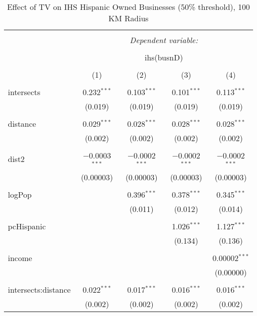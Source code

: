 
\begin{table}[!htbp] \centering 
  \caption{Effect of TV on IHS Hispanic Owned Businesses (50\% threshold), 100 KM Radius} 
  \label{} 
\begin{tabular}{@{\extracolsep{-5pt}}lcccc} 
\\[-1.8ex]\hline 
\hline \\[-1.8ex] 
 & \multicolumn{4}{c}{\textit{Dependent variable:}} \\ 
\cline{2-5} 
\\[-1.8ex] & \multicolumn{4}{c}{ihs(busnD)} \\ 
\\[-1.8ex] & (1) & (2) & (3) & (4)\\ 
\hline \\[-1.8ex] 
 intersects & 0.232$^{***}$ & 0.103$^{***}$ & 0.101$^{***}$ & 0.113$^{***}$ \\ 
  & (0.019) & (0.019) & (0.019) & (0.019) \\ 
  & & & & \\ 
 distance & 0.029$^{***}$ & 0.028$^{***}$ & 0.028$^{***}$ & 0.028$^{***}$ \\ 
  & (0.002) & (0.002) & (0.002) & (0.002) \\ 
  & & & & \\ 
 dist2 & $-$0.0003$^{***}$ & $-$0.0002$^{***}$ & $-$0.0002$^{***}$ & $-$0.0002$^{***}$ \\ 
  & (0.00003) & (0.00003) & (0.00003) & (0.00003) \\ 
  & & & & \\ 
 logPop &  & 0.396$^{***}$ & 0.378$^{***}$ & 0.345$^{***}$ \\ 
  &  & (0.011) & (0.012) & (0.014) \\ 
  & & & & \\ 
 pcHispanic &  &  & 1.026$^{***}$ & 1.127$^{***}$ \\ 
  &  &  & (0.134) & (0.136) \\ 
  & & & & \\ 
 income &  &  &  & 0.00002$^{***}$ \\ 
  &  &  &  & (0.00000) \\ 
  & & & & \\ 
 intersects:distance & 0.022$^{***}$ & 0.017$^{***}$ & 0.016$^{***}$ & 0.016$^{***}$ \\ 
  & (0.002) & (0.002) & (0.002) & (0.002) \\ 

\end{tabular}
\end{table}
